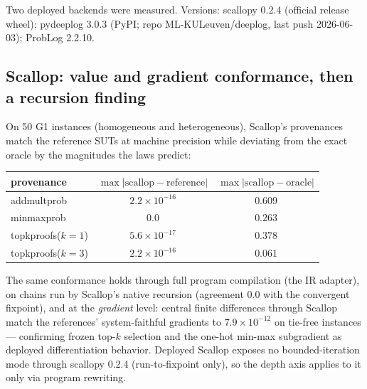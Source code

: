 \documentclass[10pt]{article}
\theoremstyle{remark}
\begin{document}
Two deployed backends were measured. Versions: scallopy 0.2.4 (official release wheel);
pydeeplog 3.0.3 (PyPI; repo ML-KULeuven/deeplog, last push 2026-06-03); ProbLog 2.2.10.

\subsection{Scallop: value and gradient conformance, then a recursion finding}

On 50 G1 instances (homogeneous and heterogeneous), Scallop's provenances match the reference
SUTs at machine precision while deviating from the exact oracle by the magnitudes the laws
predict:

\begin{center}\small
\begin{tabular}{lcc}
\toprule
provenance & $\max\lvert\text{scallop} - \text{reference}\rvert$ &
$\max\lvert\text{scallop} - \text{oracle}\rvert$\\
\midrule
addmultprob & $2.2\times10^{-16}$ & $0.609$\\
minmaxprob & $0.0$ & $0.263$\\
topkproofs($k{=}1$) & $5.6\times10^{-17}$ & $0.378$\\
topkproofs($k{=}3$) & $2.2\times10^{-16}$ & $0.061$\\
\bottomrule
\end{tabular}
\end{center}

\noindent The same conformance holds through full program compilation (the IR adapter), on chains
run by Scallop's native recursion (agreement $0.0$ with the convergent fixpoint), and at the
\emph{gradient} level: central finite differences through Scallop match the references'
system-faithful gradients to $7.9\times10^{-12}$ on tie-free instances --- confirming frozen
top-$k$ selection and the one-hot min-max subgradient as deployed differentiation behavior.
Deployed Scallop exposes no bounded-iteration mode through scallopy 0.2.4 (run-to-fixpoint only),
so the depth axis applies to it only via program rewriting.
\end{document}

